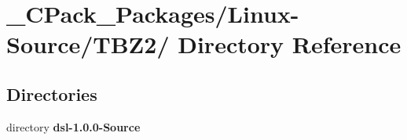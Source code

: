 \section{\_\-CPack\_\-Packages/Linux-\/Source/TBZ2/ Directory Reference}
\label{dir_03397bb155d94279ed6759aec7a680f4}
\subsection*{Directories}
\begin{DoxyCompactItemize}
\item 
directory {\bf dsl-\/1.0.0-\/Source}
\end{DoxyCompactItemize}
